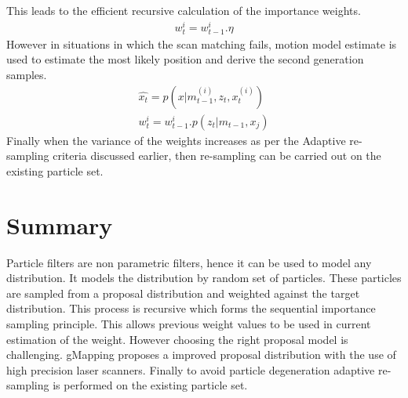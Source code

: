 This leads to the efficient recursive calculation of the importance weights.
\begin{gather} \label{gMap-w}
    w_{t}^{i} = w_{t-1}^{i}.\eta
\end{gather}
However in situations in which the scan matching fails, motion model estimate is used to estimate the most likely position and derive the second generation samples.
\begin{gather} \label{gMap-MM}
    \hat{x_t} = p(x|m_{t-1}^{(i)}, z_t, x_t^{(i)}) \\
    w_{t}^{i} = w_{t-1}^{i}.p(z_t | m_{t-1}, x_j)
\end{gather}
Finally when the variance of the weights increases as per the Adaptive re-sampling criteria discussed earlier, then re-sampling can be carried out on the existing particle set.

\section{Summary}
Particle filters are non parametric filters, hence it can be used to model any distribution. It models the distribution by random set of particles. These particles are sampled from a proposal distribution and weighted against the target distribution. This process is recursive which forms the sequential importance sampling principle. This allows previous weight values to be used in current estimation of the weight. However choosing the right proposal model is challenging. gMapping proposes a improved proposal distribution with the use of high precision laser scanners. Finally to avoid particle degeneration adaptive re-sampling is performed on the existing particle set.